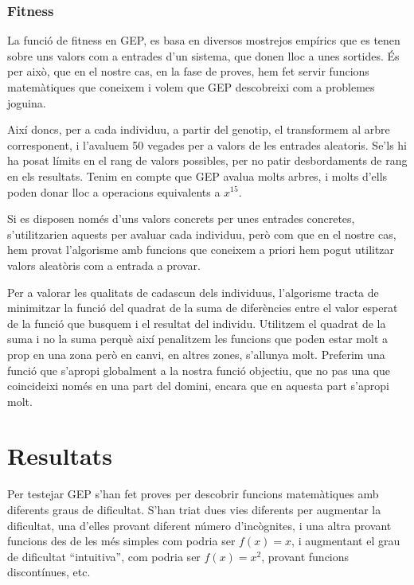 \subsubsection{Fitness} %
\label{ssub:Fitness}
La funció de fitness en GEP, es basa en diversos mostrejos empírics que es tenen
sobre uns valors com a entrades d'un sistema, que donen lloc a unes sortides.
És per això, que en el nostre cas, en la fase de proves, hem fet servir funcions
matemàtiques que coneixem i volem que GEP descobreixi com a problemes joguina.

Així doncs, per a cada individuu, a partir del genotip, el transformem al arbre
corresponent, i l'avaluem 50 vegades per a valors de les entrades aleatoris.
Se'ls hi ha posat límits en el rang de valors possibles, per no patir
desbordaments de rang en els resultats.  Tenim en compte que GEP avalua molts
arbres, i molts d'ells poden donar lloc a operacions equivalents a $x^{15}$.

Si es disposen només d'uns valors concrets per unes entrades concretes,
s'utilitzarien aquests per avaluar cada individuu, però com que en el nostre
cas, hem provat l'algorisme amb funcions que coneixem a priori hem pogut
utilitzar valors aleatòris com a entrada a provar.

Per a valorar les qualitats de cadascun dels individuus, l'algorisme tracta de
minimitzar la funció del quadrat de la suma de diferències entre el valor
esperat de la funció que busquem i el resultat del individu.  Utilitzem el
quadrat de la suma i no la suma perquè així penalitzem les funcions que poden
estar molt a prop en una zona però en canvi, en altres zones, s'allunya molt.
Preferim una funció que s'apropi globalment a la nostra funció objectiu, que no
pas una que coincideixi només en una part del domini, encara que en aquesta part
s'apropi molt.


\section{Resultats} %
\label{sec:GResultats}

Per testejar GEP s'han fet proves per descobrir funcions matemàtiques amb
diferents graus de dificultat.  S'han triat dues vies diferents per augmentar la
dificultat, una d'elles provant diferent número d'incògnites, i una altra
provant funcions des de les més simples com podria ser $f(x)=x$, i augmentant el
grau de dificultat ``intuitiva'', com podria ser $f(x)=x^2$, provant funcions
discontínues, etc.

